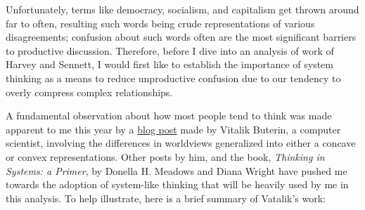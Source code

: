 \documentclass[12pt,a4paper]{article}
\begin{document}
Unfortunately, terms like democracy, socialism, and capitalism get thrown around far to often, resulting such words being crude representations of various disagreements; confusion about such words often are the most significant barriers to productive discussion. Therefore, before I dive into an analysis of work of Harvey and Sennett, I would first like to establish the importance of system thinking as a means to reduce unproductive confusion due to our tendency to overly compress complex relationships. 

A fundamental observation about how most people tend to think was made apparent to me this year by a \href{https://vitalik.ca/general/2020/11/08/concave.html}{{\color{B-Cold} blog post}} made by Vitalik Buterin, a computer scientist, involving the differences in worldviews generalized into either a concave or convex representations. Other posts by him, and the book, \textit{Thinking in Systems: a Primer}, by Donella H. Meadows and Diana Wright have pushed me towards the adoption of system-like thinking that will be heavily used by me in this analysis. To help illustrate, here is a brief summary of Vatalik's work:
\end{document}
